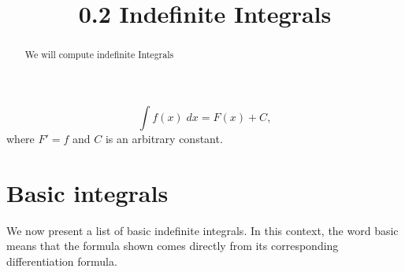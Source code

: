 \documentclass{ximera}
\title{0.2 Indefinite Integrals}
\begin{document}
\begin{abstract}
We will compute indefinite Integrals
\end{abstract}

\maketitle

\begin{definition}
\[
\int f(x) \; dx = F(x) + C,
\]
where $F' = f$ and $C$ is an arbitrary constant.

\end{definition}


\section{Basic integrals}

We now present a list of basic indefinite integrals.  In this context, the word basic means that the formula shown
comes directly from its corresponding differentiation formula.
\end{document}
